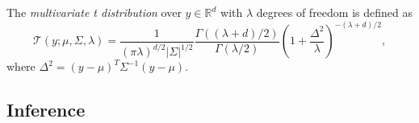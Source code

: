 \documentclass{mldsmsc}
\begin{document}
\begin{definition}
    The \textit{multivariate t distribution} over $y \in \mathbb{R}^{d}$ with $\lambda$ degrees of freedom is defined as
    \begin{equation}
        \mathcal{T}(y; \mu, \Sigma, \lambda) = \frac{1}{(\pi \lambda)^{d/2} |\Sigma|^{1/2}} \frac{\Gamma((\lambda + d)/2)}{\Gamma(\lambda / 2)} \left(1 + \frac{\Delta^2}{\lambda}\right)^{-(\lambda + d) / 2},
    \end{equation}
    where $\Delta^2 = (y - \mu)^T \Sigma^{-1} (y-\mu)$.
\end{definition}

\subsection{Inference}
\end{document}
